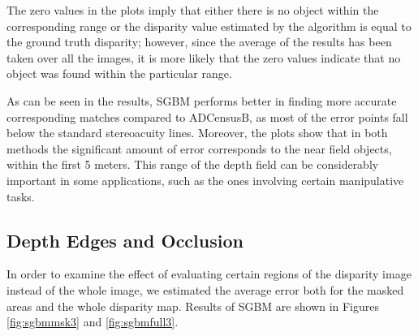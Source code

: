 The zero values in the plots imply that either there is no object within the corresponding range or the disparity value estimated by the algorithm
is equal to the ground truth disparity; however, since the average of the results has been taken over all the images, it is more likely that 
the zero values indicate that no object was found within the particular range.

As can be seen in the results, SGBM performs better in finding more accurate corresponding matches 
compared to ADCensusB, as most of the error points fall below the standard stereoacuity lines. Moreover, the plots show that in both methods 
the significant amount of error
corresponds to the near field objects, within the first 5 meters. This range of the depth field can be considerably important in some applications,
such as the ones involving certain manipulative tasks.

\subsection{Depth Edges and Occlusion}
In order to examine the effect of evaluating certain regions of the disparity image instead of the whole image, 
we estimated the average error both for the masked areas and the whole disparity map. 
Results of SGBM are shown in Figures \ref{fig:sgbmmsk3} and \ref{fig:sgbmfull3}.

